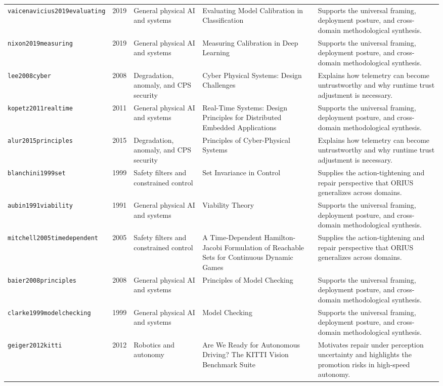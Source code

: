 \begin{longtable}{p{}p{}p{}p{}p{}}
\texttt{vaicenavicius2019evaluating} & 2019 & General physical AI and systems & Evaluating Model Calibration in Classification & Supports the universal framing, deployment posture, and cross-domain methodological synthesis.\\
\texttt{nixon2019measuring} & 2019 & General physical AI and systems & Measuring Calibration in Deep Learning & Supports the universal framing, deployment posture, and cross-domain methodological synthesis.\\
\texttt{lee2008cyber} & 2008 & Degradation, anomaly, and CPS security & Cyber Physical Systems: Design Challenges & Explains how telemetry can become untrustworthy and why runtime trust adjustment is necessary.\\
\texttt{kopetz2011realtime} & 2011 & General physical AI and systems & Real-Time Systems: Design Principles for Distributed Embedded Applications & Supports the universal framing, deployment posture, and cross-domain methodological synthesis.\\
\texttt{alur2015principles} & 2015 & Degradation, anomaly, and CPS security & Principles of Cyber-Physical Systems & Explains how telemetry can become untrustworthy and why runtime trust adjustment is necessary.\\
\texttt{blanchini1999set} & 1999 & Safety filters and constrained control & Set Invariance in Control & Supplies the action-tightening and repair perspective that ORIUS generalizes across domains.\\
\texttt{aubin1991viability} & 1991 & General physical AI and systems & Viability Theory & Supports the universal framing, deployment posture, and cross-domain methodological synthesis.\\
\texttt{mitchell2005timedependent} & 2005 & Safety filters and constrained control & A Time-Dependent Hamilton-Jacobi Formulation of Reachable Sets for Continuous Dynamic Games & Supplies the action-tightening and repair perspective that ORIUS generalizes across domains.\\
\texttt{baier2008principles} & 2008 & General physical AI and systems & Principles of Model Checking & Supports the universal framing, deployment posture, and cross-domain methodological synthesis.\\
\texttt{clarke1999modelchecking} & 1999 & General physical AI and systems & Model Checking & Supports the universal framing, deployment posture, and cross-domain methodological synthesis.\\
\texttt{geiger2012kitti} & 2012 & Robotics and autonomy & Are We Ready for Autonomous Driving? The KITTI Vision Benchmark Suite & Motivates repair under perception uncertainty and highlights the promotion risks in high-speed autonomy.\\

\end{longtable}
